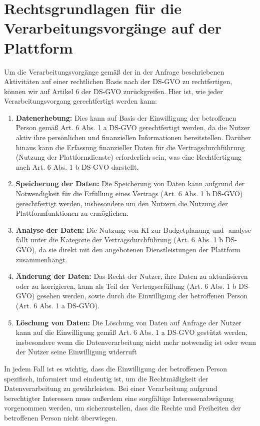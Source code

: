 \chapter{Rechtsgrundlagen für die Verarbeitungsvorgänge auf der Plattform}

Um die Verarbeitungsvorgänge gemäß der in der Anfrage beschriebenen Aktivitäten auf einer rechtlichen Basis nach der DS-GVO zu rechtfertigen, können wir auf Artikel 6 der DS-GVO zurückgreifen. Hier ist, wie jeder Verarbeitungsvorgang gerechtfertigt werden kann:

\begin{enumerate}
    \item \textbf{Datenerhebung:} Dies kann auf Basis der Einwilligung der betroffenen Person gemäß Art. 6 Abs. 1 a DS-GVO gerechtfertigt werden, da die Nutzer aktiv ihre persönlichen und finanziellen Informationen bereitstellen. Darüber hinaus kann die Erfassung finanzieller Daten für die Vertragsdurchführung (Nutzung der Plattformdienste) erforderlich sein, was eine Rechtfertigung nach Art. 6 Abs. 1 b DS-GVO darstellt.

    \item \textbf{Speicherung der Daten:} Die Speicherung von Daten kann aufgrund der Notwendigkeit für die Erfüllung eines Vertrags (Art. 6 Abs. 1 b DS-GVO) gerechtfertigt werden, insbesondere um den Nutzern die Nutzung der Plattformfunktionen zu ermöglichen.

    \item \textbf{Analyse der Daten:} Die Nutzung von KI zur Budgetplanung und -analyse fällt unter die Kategorie der Vertragsdurchführung (Art. 6 Abs. 1 b DS-GVO), da sie direkt mit den angebotenen Dienstleistungen der Plattform zusammenhängt.

    \item \textbf{Änderung der Daten:} Das Recht der Nutzer, ihre Daten zu aktualisieren oder zu korrigieren, kann als Teil der Vertragserfüllung (Art. 6 Abs. 1 b DS-GVO) gesehen werden, sowie durch die Einwilligung der betroffenen Person (Art. 6 Abs. 1 a DS-GVO).

    \item \textbf{Löschung von Daten:} Die Löschung von Daten auf Anfrage der Nutzer kann auf die Einwilligung gemäß Art. 6 Abs. 1 a DS-GVO gestützt werden, insbesondere wenn die Datenverarbeitung nicht mehr notwendig ist oder wenn der Nutzer seine Einwilligung widerruft
\end{enumerate}

In jedem Fall ist es wichtig, dass die Einwilligung der betroffenen Person spezifisch, informiert und eindeutig ist, um die Rechtmäßigkeit der Datenverarbeitung zu gewährleisten. Bei einer Verarbeitung aufgrund berechtigter Interessen muss außerdem eine sorgfältige Interessenabwägung vorgenommen werden, um sicherzustellen, dass die Rechte und Freiheiten der betroffenen Person nicht überwiegen.